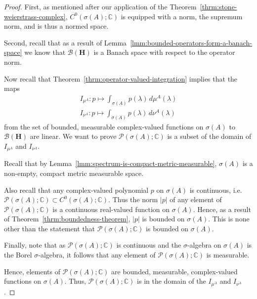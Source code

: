 \begin{proof}
First, as mentioned after our application of the Theorem~\ref{thrm:stone-weierstrass-complex}, $C^0(\sigma(A); \mathbb{C})$ is equipped with a norm, the supremum norm, and is thus a normed space.

Second, recall that as a result of Lemma~\ref{lmm:bounded-operators-form-a-banach-space} we know that $\mathcal{B}(\mathbf{H})$ is a Banach space with respect to the operator norm.

Now recall that Theorem~\ref{thrm:operator-valued-integration} implies that the maps
\begin{align}
    I_{\mu^A} : p \longmapsto \int_{\sigma(A)} p(\lambda) \, d\mu^A(\lambda) \\
    I_{\nu^A} : p \longmapsto \int_{\sigma(A)} p(\lambda) \, d\nu^A(\lambda)
\end{align}
from the set of bounded, measurable complex-valued functions on $\sigma(A)$ to $\mathcal{B}(\mathbf{H})$ are linear. We want to prove $\mathcal{P}(\sigma(A); \mathbb{C})$ is a subset of the domain of $I_{\mu^A}$ and $I_{\nu^A}$.

Recall that by Lemma~\ref{lmm:spectrum-is-compact-metric-measurable}, $\sigma(A)$ is a non-empty, compact metric measurable space.

Also recall that any complex-valued polynomial $p$ on $\sigma(A)$ is continuous, i.e. $\mathcal{P}(\sigma(A); \mathbb{C}) \subset C^0(\sigma(A); \mathbb{C})$. Thus the norm $\lvert p \rvert$ of any element of $\mathcal{P}(\sigma(A); \mathbb{C})$ is a continuous real-valued function on $\sigma(A)$. Hence, as a result of Theorem~\ref{thrm:boundedness-theorem}, $\lvert p \rvert$ is bounded on $\sigma(A)$. This is none other than the statement that $\mathcal{P}(\sigma(A); \mathbb{C})$ is bounded on $\sigma(A)$.

Finally, note that as $\mathcal{P}(\sigma(A); \mathbb{C})$ is continuous and the $\sigma$-algebra on $\sigma(A)$ is the Borel $\sigma$-algebra, it follows that any element of $\mathcal{P}(\sigma(A); \mathbb{C})$ is measurable.

Hence, elements of $\mathcal{P}(\sigma(A); \mathbb{C})$ are bounded, measurable, complex-valued functions on $\sigma(A)$. Thus, $\mathcal{P}(\sigma(A); \mathbb{C})$ is in the domain of the $I_{\mu^A}$ and $I_{\nu^A}$.


\end{proof}

